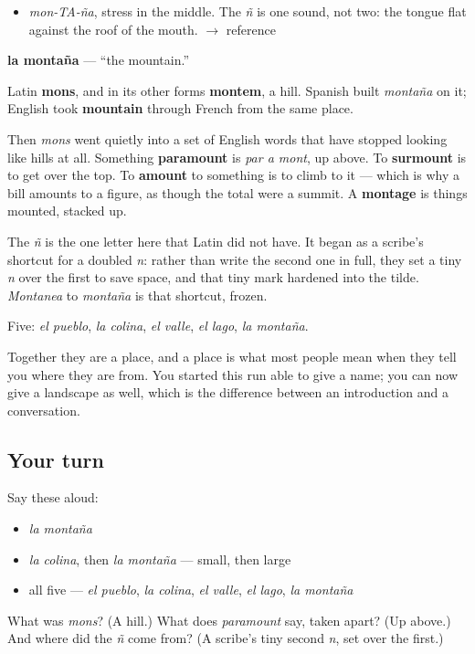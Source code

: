 \begin{sounds}
\begin{itemize}
\raggedright
  \item \emph{mon-TA-ña}, stress in the middle. The \emph{ñ} is one sound, not two: the tongue flat against the roof of the mouth. $\to$ reference
\end{itemize}
\end{sounds}

\begin{cousinweb}
\textbf{la montaña} — \textquotedblleft{}the mountain.\textquotedblright{}

Latin \textbf{mons}, and in its other forms \textbf{montem}, a hill. Spanish built \emph{montaña} on it; English took \textbf{mountain} through French from the same place.

Then \emph{mons} went quietly into a set of English words that have stopped looking like hills at all. Something \textbf{paramount} is \emph{par a mont}, up above. To \textbf{surmount} is to get over the top. To \textbf{amount} to something is to climb to it — which is why a bill amounts to a figure, as though the total were a summit. A \textbf{montage} is things mounted, stacked up.

The \emph{ñ} is the one letter here that Latin did not have. It began as a scribe's shortcut for a doubled \emph{n}: rather than write the second one in full, they set a tiny \emph{n} over the first to save space, and that tiny mark hardened into the tilde. \emph{Montanea} to \emph{montaña} is that shortcut, frozen.
\end{cousinweb}

\begin{grammarlens}[title={What you've built}]
Five: \emph{el pueblo}, \emph{la colina}, \emph{el valle}, \emph{el lago}, \emph{la montaña}.

Together they are a place, and a place is what most people mean when they tell you where they are from. You started this run able to give a name; you can now give a landscape as well, which is the difference between an introduction and a conversation.
\end{grammarlens}

\subsection*{Your turn}
Say these aloud:

\begin{itemize}
\raggedright
  \item \emph{la montaña}
  \item \emph{la colina}, then \emph{la montaña} — small, then large
  \item all five — \emph{el pueblo}, \emph{la colina}, \emph{el valle}, \emph{el lago}, \emph{la montaña}
\end{itemize}

\begin{tcolorbox}[breakable,colback=teal!4,colframe=teal!35!black,title={Before you move on}]
What was \emph{mons}? (A hill.) What does \emph{paramount} say, taken apart? (Up above.) And where did the \emph{ñ} come from? (A scribe's tiny second \emph{n}, set over the first.)
\end{tcolorbox}
